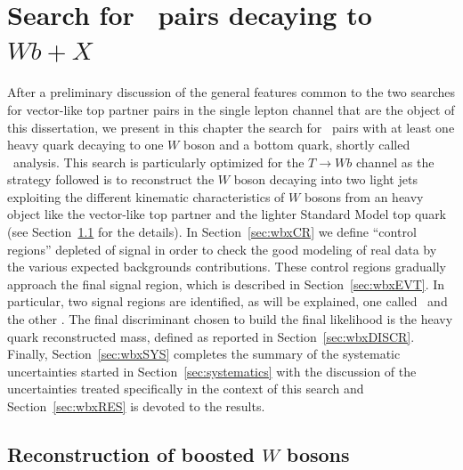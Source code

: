 \clearpage{\pagestyle{empty}\cleardoublepage}

\chapter{Search for \TTbar\ pairs decaying to $Wb+X$}\label{chap:wbx}

After a preliminary discussion of the general features
common to the two searches for vector-like top partner pairs
in the single lepton channel that are the object of this dissertation,
we present in this chapter the search for \TTbar\ pairs with
at least one heavy quark decaying to one $W$ boson and a bottom
quark, shortly called \wbx\ analysis.
This search is particularly optimized for the $T\to Wb$ channel
as the strategy followed is to reconstruct the $W$ boson decaying
into two light jets exploiting the different kinematic characteristics
of $W$ bosons from an heavy object like the vector-like top partner
and the lighter Standard Model top quark (see Section~\ref{sec:boostedW}
for the details).
In Section~\ref{sec:wbxCR} we define ``control regions'' depleted of
signal in order to check the good modeling of real data by the various expected
backgrounds contributions. These control regions gradually approach
the final signal region, which is described in Section~\ref{sec:wbxEVT}.
In particular, two signal regions are identified, as will be explained,
one called \loose\ and the other \tight.
The final discriminant chosen to build the final likelihood is
the heavy quark reconstructed mass, defined as reported in Section~\ref{sec:wbxDISCR}.
Finally, Section~\ref{sec:wbxSYS} completes the summary
of the systematic uncertainties started in Section~\ref{sec:systematics}
with the discussion of the uncertainties treated specifically
in the context of this search and
Section~\ref{sec:wbxRES} is devoted to the results.

\section{Reconstruction of boosted $W$ bosons}\label{sec:boostedW}

